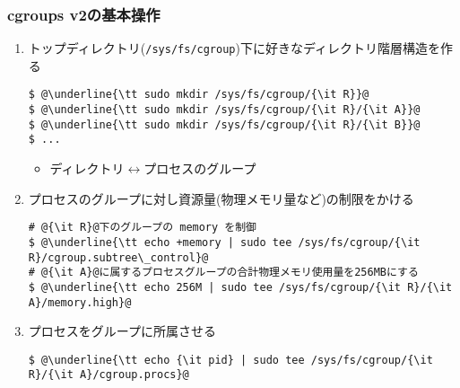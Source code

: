 \documentclass[12pt,dvipdfmx]{beamer}
\begin{document}
\begin{frame}[fragile]
\frametitle{cgroups v2の基本操作}
\begin{enumerate}
\item トップディレクトリ({\tt /sys/fs/cgroup})下に好きなディレクトリ階層構造を作る
\begin{lstlisting}
$ @\underline{\tt sudo mkdir /sys/fs/cgroup/{\it R}}@
$ @\underline{\tt sudo mkdir /sys/fs/cgroup/{\it R}/{\it A}}@
$ @\underline{\tt sudo mkdir /sys/fs/cgroup/{\it R}/{\it B}}@
$ ...
\end{lstlisting} %
\begin{itemize}
\item ディレクトリ$\leftrightarrow$プロセスのグループ
\end{itemize}
\item プロセスのグループに対し資源量(物理メモリ量など)の制限をかける
\begin{lstlisting}
# @{\it R}@下のグループの memory を制御
$ @\underline{\tt echo +memory | sudo tee /sys/fs/cgroup/{\it R}/cgroup.subtree\_control}@
# @{\it A}@に属するプロセスグループの合計物理メモリ使用量を256MBにする
$ @\underline{\tt echo 256M | sudo tee /sys/fs/cgroup/{\it R}/{\it A}/memory.high}@
\end{lstlisting} %
\item プロセスをグループに所属させる
\begin{lstlisting}
$ @\underline{\tt echo {\it pid} | sudo tee /sys/fs/cgroup/{\it R}/{\it A}/cgroup.procs}@
\end{lstlisting} %
\end{enumerate}
\end{frame}
\end{document}
